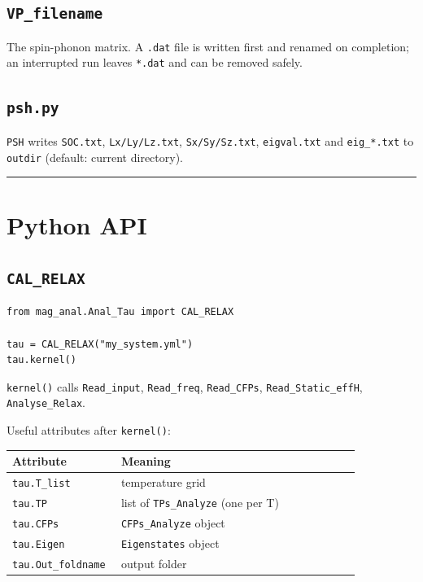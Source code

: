 \documentclass[11pt,a4paper]{article}
\providecommand{\texorpdfstring}[2]{#1}
\begin{document}
\subsection{\texorpdfstring{\texttt{VP\_filename}}{8.3 VP\_filename}}\label{vp_filename}

The spin-phonon matrix. A \texttt{.dat} file is written first and
renamed on completion; an interrupted run leaves \texttt{*.dat} and can
be removed safely.

\subsection{\texorpdfstring{\texttt{psh.py}}{8.4 psh.py}}\label{psh.py}

\texttt{PSH} writes \texttt{SOC.txt}, \texttt{Lx/Ly/Lz.txt},
\texttt{Sx/Sy/Sz.txt}, \texttt{eigval.txt} and \texttt{eig\_*.txt} to
\texttt{outdir} (default: current directory).

\begin{center}\rule{0.5\linewidth}{0.4pt}\end{center}

\section{Python API}\label{python-api}

\subsection{\texorpdfstring{\texttt{CAL\_RELAX}}{9.1 CAL\_RELAX}}\label{cal_relax}

\begin{lstlisting}
from mag_anal.Anal_Tau import CAL_RELAX

tau = CAL_RELAX("my_system.yml")
tau.kernel()
\end{lstlisting}

\texttt{kernel()} calls \texttt{Read\_input}, \texttt{Read\_freq},
\texttt{Read\_CFPs}, \texttt{Read\_Static\_effH},
\texttt{Analyse\_Relax}.

Useful attributes after \texttt{kernel()}:

\begin{longtable}[]{@{}>{\raggedright\arraybackslash}p{0.30\linewidth} >{\raggedright\arraybackslash}p{0.66\linewidth}@{}}
\toprule
Attribute & Meaning\tabularnewline
\midrule
\endhead
\texttt{tau.T\_list} & temperature grid\tabularnewline
\texttt{tau.TP} & list of \texttt{TPs\_Analyze} (one per
T)\tabularnewline
\texttt{tau.CFPs} & \texttt{CFPs\_Analyze} object\tabularnewline
\texttt{tau.Eigen} & \texttt{Eigenstates} object\tabularnewline
\texttt{tau.Out\_foldname} & output folder\tabularnewline
\bottomrule
\end{longtable}
\end{document}
